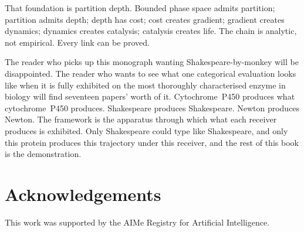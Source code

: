 \documentclass[11pt,twocolumn,a4paper]{article}
\theoremstyle{definition}
\theoremstyle{remark}
\begin{document}
That foundation is partition depth.  Bounded phase space admits partition;
partition admits depth; depth has cost; cost creates gradient; gradient creates
dynamics; dynamics creates catalysis; catalysis creates life.  The chain is
analytic, not empirical.  Every link can be proved.

The reader who picks up this monograph wanting Shakespeare-by-monkey will be
disappointed.  The reader who wants to see what one categorical evaluation
looks like when it is fully exhibited on the most thoroughly characterised
enzyme in biology will find seventeen papers' worth of it.  Cytochrome~P450
produces what cytochrome~P450 produces.  Shakespeare produces Shakespeare.
Newton produces Newton.  The framework is the apparatus through which what
each receiver produces is exhibited.  Only Shakespeare could type like
Shakespeare, and only this protein produces this trajectory under this
receiver, and the rest of this book is the demonstration.

\section*{Acknowledgements}

This work was supported by the AIMe Registry for Artificial Intelligence.



\end{document}
